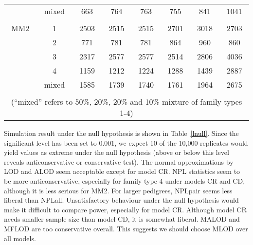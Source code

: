 \begin{table}[h]
\begin{tabular}{cccccccc}
     &mixed    &663   & 764    & 763   &  755   & 841   &  1041 \\
\\
MM2  &  1      &2503  & 2515   & 2515  &  2701  & 3018  &  2703\\
     &  2      &771   & 781    & 781   &  864   & 960   &  860\\
     &  3      &2317  & 2577   & 2577  &  2514  & 2806  &  4036\\
     &  4      &1159  & 1212   & 1224  &  1288  & 1439  &  2887\\
     &mixed    &1585  & 1739   & 1740  &  1761  & 1964  &  2675\\
\hline
\\
\multicolumn{8}{c}{(``mixed'' refers to 50\%, 20\%, 20\% and 10\% mixture of
family types 1-4)} \\
\end{tabular}
\end{table}

Simulation result under the null hypothesis is shown in Table~\ref{lnull}.
Since the significant level has been set to 0.001, we expect 10 of the
10,000 replicates would yield values as extreme under the null hypothesis
(above or below this level reveals anticonservative or conservative test).  
The normal approximations by LOD and ALOD seem acceptable except for model
CR.  NPL statistics seem to be more anticonservative, especially for
family type 4 under models CR and CD, although it is less serious for MM2.  
For larger pedigrees, NPLpair seems less liberal than NPLall.  
Unsatisfactory behaviour under the null hypothesis would make it difficult
to compare power, especially for model CR.  Although model CR needs
smaller sample size than model CD, it is somewhat liberal.  MALOD and
MFLOD are too conservative overall.  This suggests we should choose MLOD
over all models.

